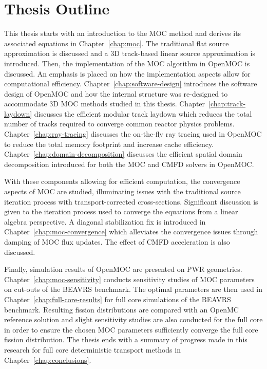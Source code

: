\section{Thesis Outline}

This thesis starts with an introduction to the \ac{MOC} method and derives its associated equations in Chapter~\ref{chap:moc}. The traditional flat source approximation is discussed and a 3D track-based linear source approximation is introduced. Then, the implementation of the \ac{MOC} algorithm in OpenMOC is discussed.  An emphasis is placed on how the implementation aspects allow for computational efficiency. Chapter~\ref{chap:software-design} introduces the software design of OpenMOC and how the internal structure was re-designed to accommodate 3D \ac{MOC} methods studied in this thesis. Chapter~\ref{chap:track-laydown} discusses the efficient modular track laydown which reduces the total number of tracks required to converge common reactor physics problems. Chapter~\ref{chap:ray-tracing} discusses the on-the-fly ray tracing used in OpenMOC to reduce the total memory footprint and increase cache efficiency. Chapter~\ref{chap:domain-decomposition} discusses the efficient spatial domain decomposition introduced for both the \ac{MOC} and \ac{CMFD} solvers in OpenMOC.

With these components allowing for efficient computation, the convergence aspects of \ac{MOC} are studied, illuminating issues with the traditional source iteration process with transport-corrected cross-sections. Significant discussion is given to the iteration process used to converge the equations from a linear algebra perspective. A diagonal stabilization fix is introduced in Chapter~\ref{chap:moc-convergence} which alleviates the convergence issues through damping of \ac{MOC} flux updates. The effect of \ac{CMFD} acceleration is also discussed. 

Finally, simulation results of OpenMOC are presented on \ac{PWR} geometries. Chapter~\ref{chap:moc-sensitivity} conducts sensitivity studies of \ac{MOC} parameters on cut-outs of the BEAVRS benchmark. The optimal parameters are then used in Chapter~\ref{chap:full-core-results} for full core simulations of the BEAVRS benchmark. Resulting fission distributions are compared with an OpenMC reference solution and slight sensitivity studies are also conducted for the full core in order to ensure the chosen \ac{MOC} parameters sufficiently converge the full core fission distribution. The thesis ends with a summary of progress made in this research for full core deterministic transport methods in Chapter~\ref{chap:conclusions}.